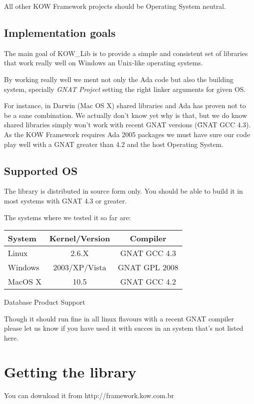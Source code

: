\documentclass[english,letterpaper]{book}
\begin{document}
All other KOW Framework projects should be Operating System neutral.



\section{Implementation goals}
The main goal of KOW\_Lib is to provide a simple and consistent set of libraries that
work really well on Windows an Unix-like operating systems.

By working really well we ment not only the Ada code but also the building system,
specially \emph{GNAT Project} setting the right linker arguments for given OS.

For instance, in Darwin (Mac OS X) shared libraries and Ada has proven not to be a sane
combination. We actually don't know yet why is that, but we do know shared libraries
simply won't work with recent GNAT versions (\~GNAT GCC 4.3). As the KOW Framework
requires Ada 2005 packages we must have sure our code play well with a GNAT
greater than 4.2 and the host Operating System.

\section{Supported OS}
\label{supported_os}
The library is distributed in source form only. You should be able to build it in
most systems with GNAT 4.3 or greater.

The systems where we tested it so far are:

\begin{floatingtable}{
   \begin{tabular}{lcc}
   System       &  Kernel/Version &  Compiler      \\
   \hline
   Linux        &  2.6.X          &  GNAT GCC 4.3  \\
   Windows      &  2003/XP/Vista  &  GNAT GPL 2008 \\
   MacOS X      &  10.5           &  GNAT GCC 4.2  \\
   \end{tabular}}
   \caption{Database Product Support}\label{t:DBSupport}
\end{floatingtable}


Though it should run fine in all linux flavours with a recent GNAT compiler please
let us know if you have used it with succes in an system that's not listed here.


\chapter{Getting the library}
\label{getting_it}
You can download it from http://framework.kow.com.br
\end{document}

